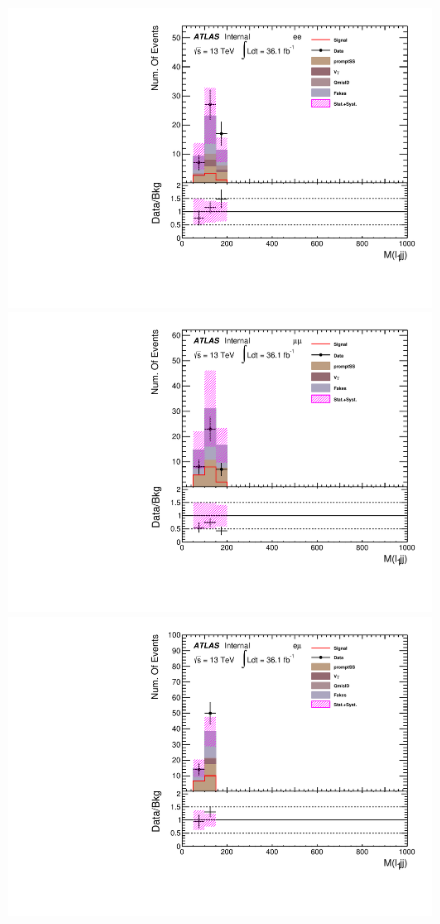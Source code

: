 \begin{figure}[h]
\begin{minipage}[t]{0.33\linewidth}
 \centering
 \includegraphics[width=1.0\textwidth,angle=-90]{fig/SigOpt/H340_S145_m_l1jj_ee.pdf}
 \end{minipage}
 \begin{minipage}[t]{0.33\linewidth}
 \centering
 \includegraphics[width=1.0\textwidth,angle=-90]{fig/SigOpt/H340_S145_m_l1jj_mumu.pdf}
 \end{minipage}
 \begin{minipage}[t]{0.33\linewidth}
 \centering
 \includegraphics[width=1.0\textwidth,angle=-90]{fig/SigOpt/H340_S145_m_l1jj_emu.pdf}

\end{minipage}
\end{figure}
